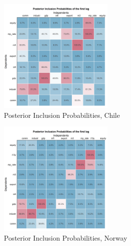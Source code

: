 \documentclass[12pt,]{article}
\begin{document}
\begin{figure}
\centering
\includegraphics[width=0.50000\textwidth]{img/pip_heatmap_CHL.png}
\caption{Posterior Inclusion Probabilities, Chile}
\end{figure}

\begin{figure}
\centering
\includegraphics[width=0.50000\textwidth]{img/pip_heatmap_NOR.png}
\caption{Posterior Inclusion Probabilities, Norway}
\end{figure}
\end{document}
